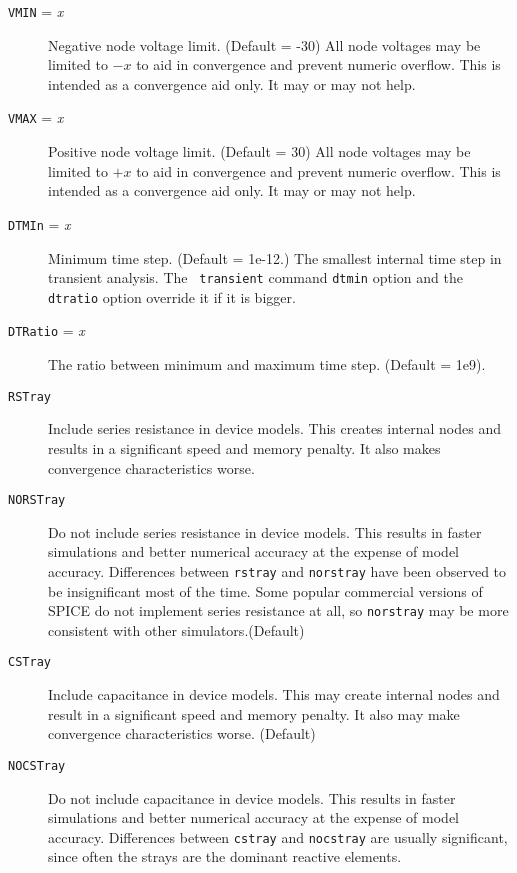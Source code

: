 \begin{description}
\item[{\tt VMIN} = {\it x}] Negative node voltage limit.  (Default
= -30)  All node voltages may be limited to $-x$ to aid in convergence
and prevent numeric overflow.  This is intended as a convergence
aid only.  It may or may not help.

\item[{\tt VMAX} = {\it x}] Positive node voltage limit.  (Default
= 30)  All node voltages may be limited to $+x$ to aid in convergence
and prevent numeric overflow.  This is intended as a convergence
aid only.  It may or may not help.

\item[{\tt DTMIn} = {\it x}] Minimum time step.  (Default = 1e-12.)
The smallest internal time step in transient analysis.  The {\tt
transient} command {\tt dtmin} option and the {\tt dtratio} option
override it if it is bigger.

\item[{\tt DTRatio} = {\it x}] The ratio between minimum and maximum
time step.  (Default = 1e9).

\item[{\tt RSTray}] Include series resistance in device models.  This 
creates internal nodes and results in a significant speed and memory 
penalty.  It also makes convergence characteristics worse.

\item[{\tt NORSTray}] Do not include series resistance in device
models.  This results in faster simulations and better numerical
accuracy at the expense of model accuracy.  Differences between
{\tt rstray} and {\tt norstray} have been observed to be insignificant
most of the time.  Some popular commercial versions of SPICE do
not implement series resistance at all, so {\tt norstray} may be
more consistent with other simulators.(Default)

\item[{\tt CSTray}] Include capacitance in device models.  This may
create internal nodes and result in a significant speed and memory 
penalty.  It also may make convergence characteristics worse.  (Default)

\item[{\tt NOCSTray}] Do not include capacitance in device models.
This results in faster simulations and better numerical accuracy
at the expense of model accuracy.  Differences between {\tt cstray}
and {\tt nocstray} are usually significant, since often the strays
are the dominant reactive elements.


\end{description}
